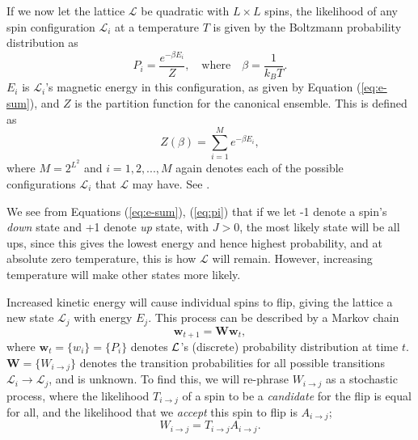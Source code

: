 \documentclass[]{article}
\begin{document}
If we now let the lattice $\mathcal{L}$ be quadratic with $L \times L$ spins, the likelihood of any spin configuration $\mathcal{L}_i$ at a temperature $T$ is given by the Boltzmann probability distribution as
\begin{equation} \label{eq:pi}
	P_i = \frac{e^{-\beta E_i}}{Z}, \quad \text{where} \quad \beta = \frac{1}{k_BT}.
\end{equation}
$E_i$ is $\mathcal{L}_i$'s magnetic energy in this configuration, as given by Equation (\ref{eq:e-sum}), and $Z$ is the partition function for the canonical ensemble. This is defined as
\begin{equation}
	Z(\beta) = \sum_{i=1}^{M} e^{-\beta E_i},
\end{equation}
where $M = 2^{L^2}$ and $i = 1,2,...,M$ again denotes each of the possible configurations $\mathcal{L}_i$ that $\mathcal{L}$ may have. See \cite{fys-stk4155-notes}.

We see from Equations (\ref{eq:e-sum}), (\ref{eq:pi}) that if we let -1 denote a spin's \textit{down} state and +1 denote \textit{up} state, with $J > 0$, the most likely state will be all ups, since this gives the lowest energy and hence highest probability, and at absolute zero temperature, this is how $\mathcal{L}$ will remain. However, increasing temperature will make other states more likely. 

Increased kinetic energy will cause individual spins to flip, giving the lattice a new state $\mathcal{L}_j$ with energy $E_j$. This process can be described by a Markov chain
\begin{equation} \label{eq:markov-chain}
	\mathbf{w}_{t+1} = \mathbf{W} \mathbf{w}_{t},
\end{equation}
where $\mathbf{w}_t = \{w_i\} = \{P_i\}$ denotes $\cal{L}$'s (discrete) probability distribution at time $t$. $\mathbf{W} = \{W_{i \rightarrow j}\}$ denotes the transition probabilities for all possible transitions $\mathcal{L}_i \rightarrow \mathcal{L}_j$, and is unknown. To find this, we will re-phrase $W_{i \rightarrow j}$ as a stochastic process, where the likelihood $T_{i \rightarrow j}$ of a spin to be a \textit{candidate} for the flip is equal for all, and the likelihood that we \textit{accept} this spin to flip is $A_{i \rightarrow j}$;
\begin{equation}
	W_{i \rightarrow j} = T_{i \rightarrow j} A_{i \rightarrow j}.
\end{equation}
\end{document}
